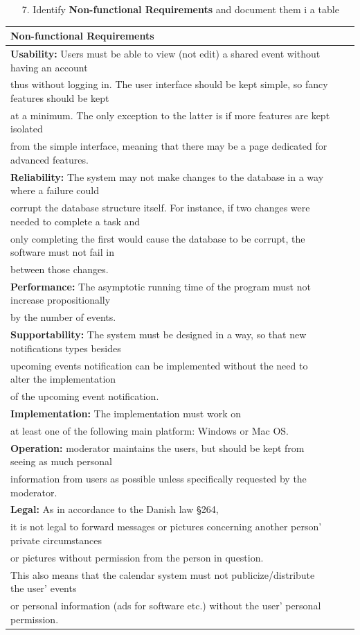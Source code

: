 \documentclass{article}
\begin{document}
\begin{enumerate}
		\item[7.] Identify \textbf{Non-functional Requirements} and document them i a table\\
\end{enumerate}

\begin{tabular}{l r @{} l}
	\textbf{Non-functional Requirements}\\
	\hline
	\textbf{Usability:} Users must be able to view (not edit) a shared event without having an account\\
	 thus without logging in. The user interface should be kept simple, so fancy features should be kept\\
	 at a minimum. The only exception to the latter is if more features are kept isolated\\ 
	 from the simple interface, meaning that there may be a page dedicated for advanced features.\\
	\hline
	\textbf{Reliability:} The system may not make changes to the database in a way where a failure could\\
	 corrupt the database structure itself. For instance, if two changes were needed to complete a task and\\
	 only completing the first would cause the database to be corrupt, the software must not fail in\\
	 between those changes.\\
	\hline
	\textbf{Performance:} The asymptotic running time of the program must not increase propositionally\\
	by the number of events.\\
	\hline
	\textbf{Supportability:} The system must be designed in a way, so that new notifications types besides\\
	upcoming events notification can be implemented without the need to alter the implementation\\
	of the upcoming event notification.\\
	\hline
	\textbf{Implementation:} The implementation must work on\\
	at least one of the following main platform: Windows or Mac OS.\\
	\hline
	\textbf{Operation:} moderator maintains the users, but should be kept from seeing as much personal\\
	 information from users as possible unless specifically requested by the moderator.\\
	\hline
	\textbf{Legal:}  As in accordance to the Danish law \S 264,\\
	 it is not legal to forward messages or pictures concerning another person’ private circumstances\\
	 or pictures without permission from the person in question.\\ 
	This also means that the calendar system must not publicize/distribute the user’ events\\
	 or personal information (ads for software etc.) without the user’ personal permission.\\
	\hline
\end{tabular}
\end{document}
